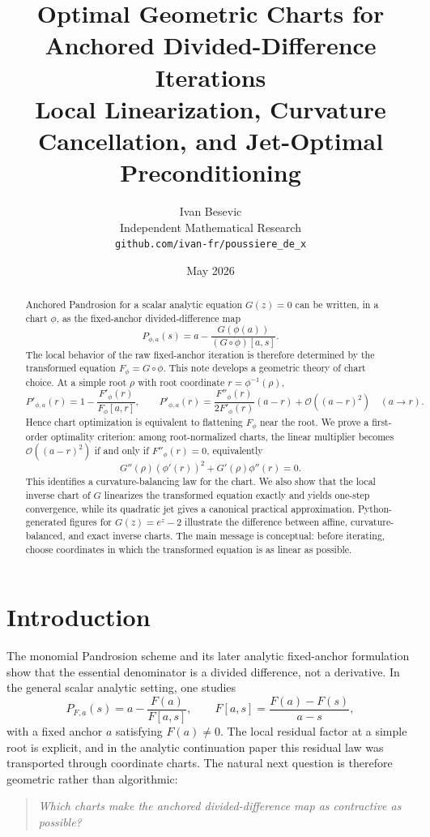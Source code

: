 \documentclass[11pt]{article}
\title{Optimal Geometric Charts for Anchored Divided-Difference Iterations\\
\large Local Linearization, Curvature Cancellation, and Jet-Optimal Preconditioning}
\author{Ivan Besevic\\Independent Mathematical Research\\\texttt{github.com/ivan-fr/poussiere\_de\_x}}
\date{May 2026}
\theoremstyle{definition}
\newcommand{\Oterm}{\mathcal{O}}
\begin{document}
\maketitle

\begin{abstract}
Anchored Pandrosion for a scalar analytic equation $G(z)=0$ can be written, in a chart $\phi$, as the fixed-anchor divided-difference map
\[
P_{\phi,a}(s)=a-\frac{G(\phi(a))}{(G\circ \phi)[a,s]}.
\]
The local behavior of the raw fixed-anchor iteration is therefore determined by the transformed equation $F_{\phi}=G\circ\phi$. This note develops a geometric theory of chart choice. At a simple root $\rho$ with root coordinate $r=\phi^{-1}(\rho)$,
\[
P'_{\phi,a}(r)=1-\frac{F'_{\phi}(r)}{F_{\phi}[a,r]},
\qquad
P'_{\phi,a}(r)=\frac{F''_{\phi}(r)}{2F'_{\phi}(r)}(a-r)+\Oterm((a-r)^2)
\quad (a\to r).
\]
Hence chart optimization is equivalent to flattening $F_{\phi}$ near the root. We prove a first-order optimality criterion: among root-normalized charts, the linear multiplier becomes $\Oterm((a-r)^2)$ if and only if $F''_{\phi}(r)=0$, equivalently
\[
G''(\rho)(\phi'(r))^2+G'(\rho)\phi''(r)=0.
\]
This identifies a curvature-balancing law for the chart. We also show that the local inverse chart of $G$ linearizes the transformed equation exactly and yields one-step convergence, while its quadratic jet gives a canonical practical approximation. Python-generated figures for $G(z)=e^z-2$ illustrate the difference between affine, curvature-balanced, and exact inverse charts. The main message is conceptual: before iterating, choose coordinates in which the transformed equation is as linear as possible.
\end{abstract}

\section{Introduction}
The monomial Pandrosion scheme and its later analytic fixed-anchor formulation show that the essential denominator is a divided difference, not a derivative. In the general scalar analytic setting, one studies
\[
P_{F,a}(s)=a-\frac{F(a)}{F[a,s]},
\qquad
F[a,s]=\frac{F(a)-F(s)}{a-s},
\]
with a fixed anchor $a$ satisfying $F(a)\neq 0$. The local residual factor at a simple root is explicit, and in the analytic continuation paper this residual law was transported through coordinate charts. The natural next question is therefore geometric rather than algorithmic:
\begin{quote}
\emph{Which charts make the anchored divided-difference map as contractive as possible?}
\end{quote}
\end{document}
